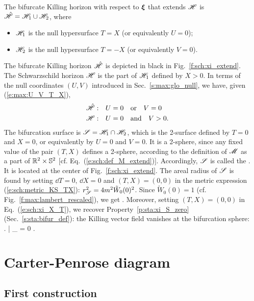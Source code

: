 The bifurcate Killing horizon with respect to $\bm{\xi}$
that extends $\mathscr{H}$
is $\hat{\mathscr{H}} = \mathscr{H}_1 \cup \mathscr{H}_2 $, where
\begin{itemize}
\item $\mathscr{H}_1$ is the null hypersurface $T=X$ (or equivalently $U=0$);
\item $\mathscr{H}_2$ is the null hypersurface $T=-X$ (or equivalently $V=0$).
\end{itemize}
The bifurcate Killing horizon $\hat{\mathscr{H}}$ is depicted in black in
Fig.~\ref{f:sch:xi_extend}.
The Schwarzschild horizon $\mathscr{H}$ is the part of $\mathscr{H}_1$ defined by $X>0$.
In terms of the null coordinates $(U,V)$ introduced in Sec.~\ref{s:max:glo_null},
we have, given (\ref{e:max:U_V_T_X}),
\begin{subequations}
\label{e:max:Hor_U_V}
\begin{align}
    \hat{\mathscr{H}}:\quad&  U = 0 \quad\mbox{or}\quad V = 0 \\
    \mathscr{H}:\quad &   U = 0 \quad\mbox{and}\quad V > 0 .
\end{align}
\end{subequations}
The bifurcation surface is $\mathscr{S} = \mathscr{H}_1 \cap \mathscr{H}_2$, which
is the 2-surface defined by $T=0$ and $X=0$, or equivalently by
$U=0$ and $V=0$. It is a 2-sphere, since
any fixed value of the pair $(T,X)$ defines a 2-sphere, according to the
definition of $\mathscr{M}$ as a part of $\mathbb{R}^2\times\mathbb{S}^2$
[cf. Eq.~(\ref{e:sch:def_M_extend})]. Accordingly, $\mathscr{S}$ is called the
. It is located at the
center of Fig.~\ref{f:sch:xi_extend}.
The areal radius of $\mathscr{S}$ is found by setting
$\dd T = 0$, $\dd X = 0$ and $(T,X)=(0,0)$ in the metric expression
(\ref{e:sch:metric_KS_TX}): $r_{\mathscr{S}}^2 = 4m^2 \tilde{W}_0(0)^2$.
Since $\tilde{W}_0(0)=1$ (cf. Fig.~\ref{f:max:lambert_rescaled}), we get
\be
     .
\ee
Moreover, setting $(T,X)=(0,0)$ in Eq.~(\ref{e:sch:xi_X_T}),
we recover Property~\ref{p:sta:xi_S_zero} (Sec.~\ref{s:sta:bifur_def}): the Killing
vector field vanishes at the bifurcation sphere:
\be
\left. \w{\xi} \right| _{\Sp} = 0 .
\ee


\section{Carter-Penrose diagram} \label{s:max:Carter-Penrose}

\subsection{First construction}

